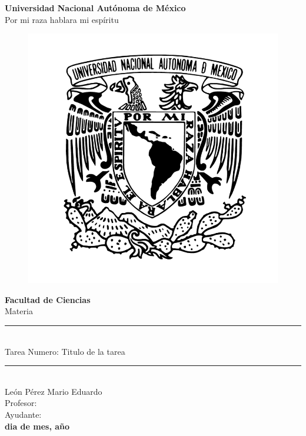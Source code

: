 \begin{titlepage}
    \begin{center}
        {\huge \textbf{Universidad Nacional Autónoma de México}}\\
        \vspace{3mm}
        {\large {Por mi raza hablara mi espíritu}}\\
        \vspace{1mm}
        \begin{figure}[h]
            \centering
            \includegraphics[scale=0.2]{Imagenes/UNAM.png}
        \end{figure}
        {\Large \textbf{Facultad de Ciencias}}\\
        \vspace{3mm}
        {\large {Materia}}\\
        \vspace{1cm}
        
        \rule{\linewidth}{0.50mm}\\
        \vspace{2mm}
            {\huge Tarea Numero: Titulo de la tarea}
        \vspace{2mm}
        \rule{\linewidth}{0.50mm}\\
        {\LARGE {León Pérez Mario Eduardo}}\\
        \vspace{10mm}
        {\large {Profesor:  }}\\
        \vspace{2mm}
        {\large {Ayudante: }}\\
        \vspace{2mm}
        \vfill
        {\large \textbf{dia de mes, año}}
    \end{center}
\end{titlepage}